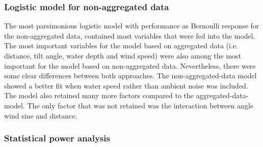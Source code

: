 \documentclass[doublespacing,linenumbers]{bmcart}
\begin{document}
\subsubsection*{Logistic model for non-aggregated data}

The most parsimonious logistic model with performance as Bernoulli response for the non-aggregated data, contained most variables that were fed into the model. The most important variables for the model based on aggregated data (i.e. distance, tilt angle, water depth and wind speed) were also among the most important for the model based on non-aggregated data. Nevertheless, there were some clear differences between both approaches. The non-aggregated-data model showed a better fit when water speed rather than ambient noise was included. The model also retained many more factors compared to the aggregated-data-model. The only factor that was not retained was the interaction between angle wind sine and distance.  

\subsubsection*{Statistical power analysis}
\end{document}

